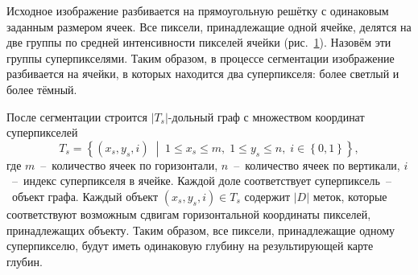\documentclass{ConfFTI}
\begin{document}
Исходное изображение разбивается на прямоугольную решётку
с одинаковым заданным размером ячеек.
Все пиксели, принадлежащие одной ячейке,
делятся на две группы по средней интенсивности пикселей ячейки
(рис.~\ref{fig:cell:superpixels}).
Назовём эти группы суперпикселями.
Таким образом, в процессе сегментации изображение разбивается на ячейки,
в которых находится два суперпикселя: более светлый и более тёмный.

\begin{figure}[h!]
    \centering
     \qquad
    \label{fig:cell:superpixels}
\end{figure}

После сегментации строится $\left| T_s \right|$-дольный граф
с множеством координат суперпикселей
\begin{equation*}
    T_s = \left\{
        \left(x_s, y_s, i \right) \; \middle| \;
        1 \le x_s \le m, \;
        1 \le y_s \le n, \;
        i \in \left\{ 0, 1 \right\}
    \right\},
\end{equation*}
где $m$~--~количество ячеек по горизонтали,
$n$~--~количество ячеек по вертикали,
$i$~--~индекс суперпикселя в ячейке.
Каждой доле соответствует суперпиксель~--~объект графа.
Каждый объект $\left( x_s, y_s, i \right) \in T_s$ содержит
$\left| D \right|$ меток,
которые соответствуют возможным сдвигам горизонтальной координаты пикселей,
принадлежащих объекту.
Таким образом, все пиксели,
принадлежащие одному суперпикселю,
будут иметь одинаковую глубину на результирующей карте глубин.
\end{document}
